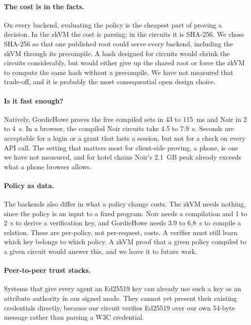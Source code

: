\documentclass[11pt]{article}
\begin{document}
\paragraph{The cost is in the facts.} On every backend, evaluating the policy is the cheapest part of proving a decision. In the zkVM the cost is parsing; in the circuits it is SHA-256. We chose SHA-256 so that one published root could serve every backend, including the zkVM through its precompile. A hash designed for circuits would shrink the circuits considerably, but would either give up the shared root or force the zkVM to compute the same hash without a precompile. We have not measured that trade-off, and it is probably the most consequential open design choice.

\paragraph{Is it fast enough?} Natively, GordieHowe proves the five compiled sets in 43 to 115~ms and Noir in 2 to 4~s. In a browser, the compiled Noir circuits take 4.5 to 7.9~s. Seconds are acceptable for a login or a grant that lasts a session, but not for a check on every API call. The setting that matters most for client-side proving, a phone, is one we have not measured, and for hotel chains Noir's 2.1~GB peak already exceeds what a phone browser allows.

\paragraph{Policy as data.} The backends also differ in what a policy change costs. The zkVM needs nothing, since the policy is an input to a fixed program. Noir needs a compilation and 1 to 2~s to derive a verification key, and GordieHowe needs 3.9 to 6.8~s to compile a relation. These are per-policy, not per-request, costs. A verifier must still learn which key belongs to which policy. A zkVM proof that a given policy compiled to a given circuit would answer this, and we leave it to future work.

\paragraph{Peer-to-peer trust stacks.} Systems that give every agent an Ed25519 key can already use such a key as an attribute authority in our signed mode. They cannot yet present their existing credentials directly, because our circuit verifies Ed25519 over our own 54-byte message rather than parsing a W3C credential.
\end{document}
